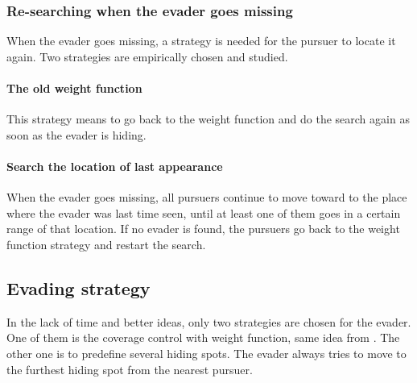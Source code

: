\documentclass[ebook,11pt] {kth-mag}
\begin{document}
\subsubsection{Re-searching when the evader goes missing}
When the evader goes missing, a strategy is needed for the pursuer to locate it again. Two strategies are empirically chosen and studied. 
\paragraph{The old weight function}
This strategy means to go back to the weight function  and do the search again as soon as the evader is hiding. 
\paragraph{Search the location of last appearance}
When the evader goes missing, all pursuers continue to move toward to the place where the evader was last time seen, until at least one of them goes in a certain range of that location. If no evader is found, the pursuers go back to the weight function strategy and restart the search. 

\subsection{Evading strategy}
In the lack of time and better ideas, only two strategies are chosen for the evader. One of them is the coverage control with weight function, same idea from \cite{sui}. The other one is to predefine several hiding spots. The evader always tries to move to the furthest hiding spot from the nearest pursuer. 
\end{document}
